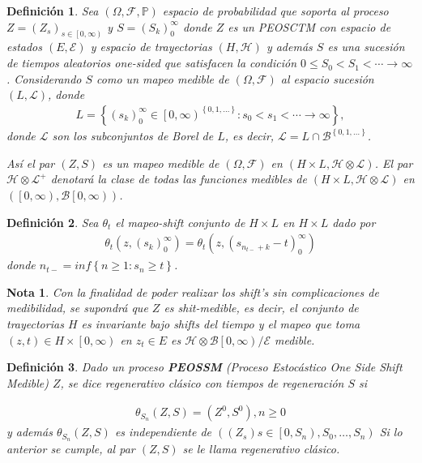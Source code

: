 \documentclass{article}
\newtheorem{Def}{Definición}
\newtheorem{Note}{Nota}
\newcommand{\prob}{\mathbb{P}}
\begin{document}
\begin{Def}
Sea $\left(\Omega,\mathcal{F},\prob\right)$ espacio de probabilidad que soporta al proceso $Z=\left(Z_{s}\right)_{s\in\left[0,\infty\right)}$ y $S=\left(S_{k}\right)_{0}^{\infty}$ donde $Z$ es un PEOSCTM con espacio de estados $\left(E,\mathcal{E}\right)$  y espacio de trayectorias $\left(H,\mathcal{H}\right)$  y adem\'as $S$ es una sucesi\'on de tiempos aleatorios one-sided que satisfacen la condici\'on $0\leq S_{0}<S_{1}<\cdots\rightarrow\infty$. Considerando $S$ como un mapeo medible de $\left(\Omega,\mathcal{F}\right)$ al espacio sucesi\'on $\left(L,\mathcal{L}\right)$, donde 
\begin{eqnarray*}
L=\left\{\left(s_{k}\right)_{0}^{\infty}\in\left[0,\infty\right)^{\left\{0,1,\ldots\right\}}:s_{0}<s_{1}<\cdots\rightarrow\infty\right\},
\end{eqnarray*}
donde $\mathcal{L}$ son los subconjuntos de Borel de $L$, es decir, $\mathcal{L}=L\cap\mathcal{B}^{\left\{0,1,\ldots\right\}}$.

As\'i el par $\left(Z,S\right)$ es un mapeo medible de  $\left(\Omega,\mathcal{F}\right)$ en $\left(H\times L,\mathcal{H}\otimes\mathcal{L}\right)$. El par $\mathcal{H}\otimes\mathcal{L}^{+}$ denotar\'a la clase de todas las funciones medibles de $\left(H\times L,\mathcal{H}\otimes\mathcal{L}\right)$ en $\left(\left[0,\infty\right),\mathcal{B}\left[0,\infty\right)\right)$.
\end{Def}


\begin{Def}
Sea $\theta_{t}$ el mapeo-shift conjunto de $H\times L$ en $H\times L$ dado por
\begin{eqnarray*}
\theta_{t}\left(z,\left(s_{k}\right)_{0}^{\infty}\right)=\theta_{t}\left(z,\left(s_{n_{t-}+k}-t\right)_{0}^{\infty}\right)
\end{eqnarray*}
donde 
$n_{t-}=inf\left\{n\geq1:s_{n}\geq t\right\}$.
\end{Def}

\begin{Note}
Con la finalidad de poder realizar los shift's sin complicaciones de medibilidad, se supondr\'a que $Z$ es shit-medible, es decir, el conjunto de trayectorias $H$ es invariante bajo shifts del tiempo y el mapeo que toma $\left(z,t\right)\in H\times\left[0,\infty\right)$ en $z_{t}\in E$ es $\mathcal{H}\otimes\mathcal{B}\left[0,\infty\right)/\mathcal{E}$ medible.
\end{Note}

\begin{Def}
Dado un proceso \textbf{PEOSSM} (Proceso Estoc\'astico One Side Shift Medible) $Z$, se dice regenerativo cl\'asico con tiempos de regeneraci\'on $S$ si 

\begin{eqnarray*}
\theta_{S_{n}}\left(Z,S\right)=\left(Z^{0},S^{0}\right),n\geq0
\end{eqnarray*}
y adem\'as $\theta_{S_{n}}\left(Z,S\right)$ es independiente de $\left(\left(Z_{s}\right)s\in\left[0,S_{n}\right),S_{0},\ldots,S_{n}\right)$
Si lo anterior se cumple, al par $\left(Z,S\right)$ se le llama regenerativo cl\'asico.
\end{Def}
\end{document}
